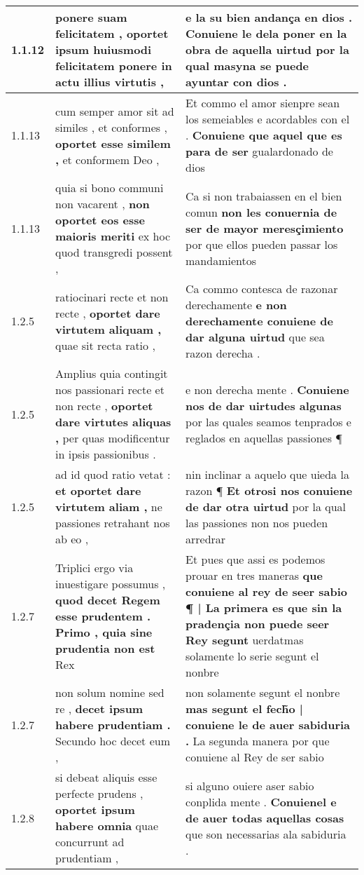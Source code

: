 \begin{tabular}{|p{1cm}|p{6.5cm}|p{6.5cm}|}
1.1.12 & ponere suam felicitatem , \textbf{ oportet ipsum huiusmodi felicitatem ponere } in actu illius virtutis , & e la su bien andança en dios . \textbf{ Conuiene le dela poner en la obra de aquella uirtud } por la qual masyna se puede ayuntar con dios . \\\hline
1.1.13 & cum semper amor sit ad similes , et conformes , \textbf{ oportet esse similem , } et conformem Deo , & Et commo el amor sienpre sean los semeiables e acordables con el . \textbf{ Conuiene que aquel que es para de ser } gualardonado de dios \\\hline
1.1.13 & quia si bono communi non vacarent , \textbf{ non oportet eos esse maioris meriti } ex hoc quod transgredi possent , & Ca si non trabaiassen en el bien comun \textbf{ non les conuernia de ser de mayor meresçimiento } por que ellos pueden passar los mandamientos \\\hline
1.2.5 & ratiocinari recte et non recte , \textbf{ oportet dare virtutem aliquam , } quae sit recta ratio , & Ca commo contesca de razonar derechamente \textbf{ e non derechamente conuiene de dar alguna uirtud } que sea razon derecha . \\\hline
1.2.5 & Amplius quia contingit nos passionari recte et non recte , \textbf{ oportet dare virtutes aliquas , } per quas modificentur in ipsis passionibus . & e non derecha mente . \textbf{ Conuiene nos de dar uirtudes algunas } por las quales seamos tenprados e reglados en aquellas passiones ¶ \\\hline
1.2.5 & ad id quod ratio vetat : \textbf{ et oportet dare virtutem aliam , } ne passiones retrahant nos ab eo , & nin inclinar a aquelo que uieda la razon ¶ \textbf{ Et otrosi nos conuiene de dar otra uirtud } por la qual las passiones non nos pueden arredrar \\\hline
1.2.7 & Triplici ergo via inuestigare possumus , \textbf{ quod decet Regem esse prudentem . Primo , quia sine prudentia non est } Rex & Et pues que assi es podemos prouar en tres maneras \textbf{ que conuiene al rey de seer sabio ¶ | La primera es que sin la pradençia non puede seer Rey segunt } uerdatmas solamente lo serie segunt el nonbre \\\hline
1.2.7 & non solum nomine sed re , \textbf{ decet ipsum habere prudentiam . } Secundo hoc decet eum , & non solamente segunt el nonbre \textbf{ mas segunt el fech̃o | conuiene le de auer sabiduria . } La segunda manera por que conuiene al Rey de ser sabio \\\hline
1.2.8 & si debeat aliquis esse perfecte prudens , \textbf{ oportet ipsum habere omnia } quae concurrunt ad prudentiam , & si alguno ouiere aser sabio conplida mente . \textbf{ Conuienel e de auer todas aquellas cosas } que son necessarias ala sabiduria . \\\hline

\end{tabular}
